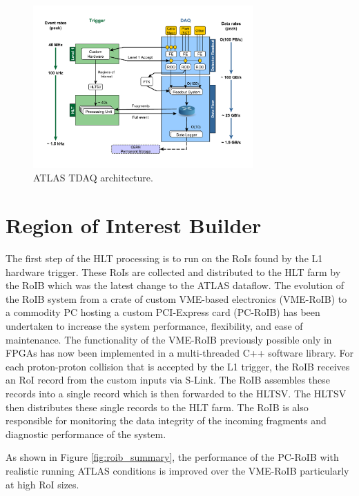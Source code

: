 \begin{figure}[!t]
\centering
\includegraphics[width=0.75\textwidth]{tdaqFullNew2016}
\vspace{-0.5cm}
\caption{ATLAS TDAQ architecture.}
\label{fig:tdaq_diagram}
\end{figure} 

\section{Region of Interest Builder}

The first step of the HLT processing is to run on the RoIs found by the L1 hardware trigger. These
RoIs are collected and distributed to the HLT farm by the RoIB \cite{1748-0221-11-02-C02080} which was the 
latest change to the ATLAS dataflow. 
The
evolution of the RoIB system from a crate of custom VME-based electronics (VME-RoIB) to a commodity
PC hosting a custom PCI-Express card (PC-RoIB) has been undertaken to increase the system performance,
flexibility, and ease of maintenance. The functionality of the VME-RoIB previously possible only in FPGAs has
now been implemented in a multi-threaded C++ software library. 
For each proton-proton collision that is accepted by the L1 trigger, the
RoIB receives an RoI record from the custom inputs via S-Link. The RoIB assembles these records into
a single record which is then forwarded to the HLTSV. The HLTSV then
distributes these single records to the HLT farm. The RoIB is also responsible for monitoring the
data integrity of the incoming fragments and diagnostic performance of the system.

As shown in Figure \ref{fig:roib_summary}, the performance of the PC-RoIB with realistic running ATLAS conditions
is improved over the VME-RoIB particularly at high RoI sizes. 

